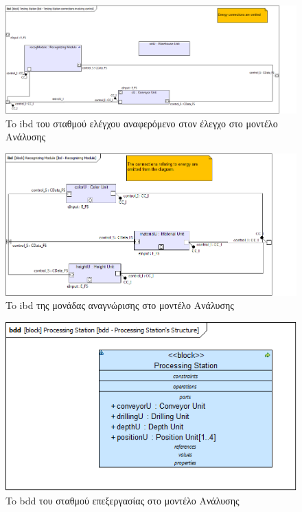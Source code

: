 \documentclass[a4paper,12pt,twoside]{report}
\begin{document}
\begin{appendices}
			\begin{figure}[hp]
					\centering
					\includegraphics[scale=0.30]{AnalysisModel_ibd-TestingStationconnectionsinvolvingcontrol.png}
					\caption{To ibd του σταθμού ελέγχου αναφερόμενο στον έλεγχο στο μοντέλο Ανάλυσης}
					\label{φωτ:To ibd του σταθμού ελέγχου αναφερόμενο στον έλεγχο στο μοντέλο Ανάλυσης}
			\end{figure}
			
			\begin{figure}[hp]
					\centering
					\includegraphics[scale=0.30]{AnalysisModel_ibd-RecognizingModule.png}
					\caption{To ibd της μονάδας αναγνώρισης στο μοντέλο Ανάλυσης}
					\label{φωτ:To ibd της μονάδας αναγνώρισης στο μοντέλο Ανάλυσης}
			\end{figure}
			
			\begin{figure}[hp]
					\centering
					\includegraphics[scale=0.30]{AnalysisModel_bdd-ProcessingStationsStructure.png}
					\caption{To bdd του σταθμού επεξεργασίας στο μοντέλο Ανάλυσης}
					\label{φωτ:To bdd του σταθμού επεξεργασίας στο μοντέλο Ανάλυσης}
			\end{figure}
			

\end{appendices}
\end{document}
